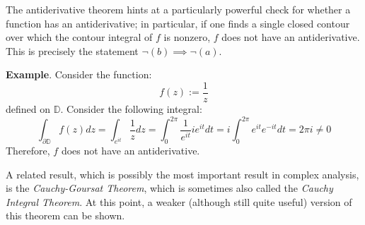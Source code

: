 The antiderivative theorem hints at a particularly powerful check for whether a function has an antiderivative; in particular, if one finds a single closed contour over which the contour integral of $f$ is nonzero, $f$ does not have an antiderivative. This is precisely the statement $\neg (b) \implies \neg (a)$.

\textbf{Example}. Consider the function: \[f(z):= \frac{1}{z}\] defined on $\mathbb{D}$. Consider the following integral: \[\int_{\partial\mathbb{D}} f(z)dz = \int_{e^{it}} \frac{1}{z}dz = \int_0^{2\pi} \frac{1}{e^{it}} ie^{it} dt = i\int_0^{2\pi} e^{it}e^{-it}dt = 2\pi i \neq 0\] Therefore, $f$ does not have an antiderivative. 

A related result, which is possibly the most important result in complex analysis, is the \textit{Cauchy-Goursat Theorem}, which is sometimes also called the \textit{Cauchy Integral Theorem}. At this point, a weaker (although still quite useful) version of this theorem can be shown.


